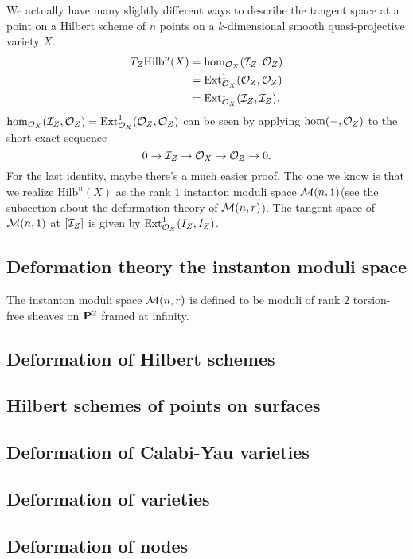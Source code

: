 \documentclass[../main.tex]{subfiles}
\begin{document}
\begin{remark}
We actually have many slightly different ways to describe the tangent space at a point on a Hilbert scheme of $n$ points on a $k$-dimensional smooth quasi-projective variety $X$.
\begin{align*}T_{Z}\mathrm{Hilb}^{n}(X)&=\hom_{\O_{X}}(\I_{Z}, \O_{Z})\\
&=\ext^1_{\O_{X}}(\O_{Z},\O_{Z})\\
&=\ext^{1}_{\O_{X}}(\I_{Z}, \I_{Z}).
\end{align*}
$\hom_{\O_{X}}(\I_{Z}, \O_{Z})=\ext^1_{\O_{X}}(\O_{Z},\O_{Z})$ can be seen by applying $\hom(-, \O_{Z})$ to the short exact sequence 
$$0\rightarrow \I_{Z}\rightarrow \O_{X}\rightarrow \O_{Z}\rightarrow 0.$$
For the last identity, maybe there's a much easier proof. The one we know is that we realize $\mathrm{Hilb}^{n}(X)$ as the rank $1$ instanton moduli space $\M(n,1)$(see the subsection about the deformation theory of $\M(n,r)$). The tangent space of $\M(n,1)$ at $[\I_{Z}]$ is given by $\ext^{1}_{\O_{X}}(I_{Z}, I_{Z})$. 
\end{remark}


\subsection{Deformation theory the instanton moduli space}
The instanton moduli space $\M(n,r)$ is defined to be moduli of rank $2$ torsion-free sheaves on $\P^{2}$ framed at infinity.
\subsection{Deformation of Hilbert schemes}
\subsection{Hilbert schemes of points on surfaces}
\subsection{Deformation of Calabi-Yau varieties}

\subsection{Deformation of varieties}
\subsection{Deformation of nodes}
\end{document}
